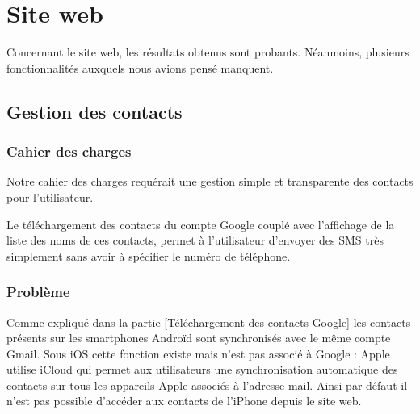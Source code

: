 \section{Site web}

Concernant le site web, les résultats obtenus sont probants.
Néanmoins, plusieurs fonctionnalités auxquels nous avions pensé manquent.
\\




\subsection{Gestion des contacts}


\subsubsection{Cahier des charges}

Notre cahier des charges requérait une gestion simple et transparente des contacts pour l'utilisateur.

Le téléchargement des contacts du compte Google couplé avec l'affichage de la liste des noms de ces contacts, permet à l'utilisateur d'envoyer des SMS très simplement sans avoir à spécifier le numéro de téléphone.
\\


\subsubsection{Problème}

Comme expliqué dans la partie \ref{Téléchargement des contacts Google} les contacts présents sur les smartphones Androïd sont synchronisés avec le même compte Gmail.
Sous iOS cette fonction existe mais n'est pas associé à Google : Apple utilise iCloud qui permet aux utilisateurs une synchronisation automatique des contacts sur tous les appareils Apple associés à l'adresse mail.
Ainsi par défaut il n'est pas possible d'accéder aux contacts de l'iPhone depuis le site web.


